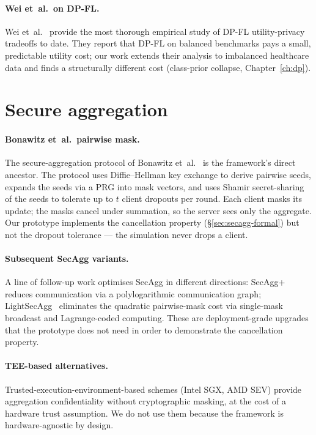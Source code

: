 \documentclass[11pt,a4paper]{report}
\begin{document}
\paragraph{Wei et~al.\ on DP-FL.} Wei et~al.~\cite{wei2020dpfl} provide
the most thorough empirical study of DP-FL utility-privacy tradeoffs to
date. They report that DP-FL on balanced benchmarks pays a small,
predictable utility cost; our work extends their analysis to imbalanced
healthcare data and finds a structurally different cost (class-prior
collapse, Chapter~\ref{ch:dp}).

\section{Secure aggregation}\label{sec:rw-secagg}

\paragraph{Bonawitz et~al.\ pairwise mask.} The secure-aggregation
protocol of Bonawitz et~al.~\cite{bonawitz2017secagg} is the framework's
direct ancestor. The protocol uses Diffie--Hellman key exchange to
derive pairwise seeds, expands the seeds via a PRG into mask vectors,
and uses Shamir secret-sharing of the seeds to tolerate up to $t$ client
dropouts per round. Each client masks its update; the masks cancel under
summation, so the server sees only the aggregate. Our prototype
implements the cancellation property (\S\ref{sec:secagg-formal}) but not
the dropout tolerance --- the simulation never drops a client.

\paragraph{Subsequent SecAgg variants.} A line of follow-up work
optimises SecAgg in different directions: SecAgg+~\cite{bell2020secaggplus}
reduces communication via a polylogarithmic communication graph;
LightSecAgg~\cite{so2022lightsecagg} eliminates the quadratic pairwise-mask
cost via single-mask broadcast and Lagrange-coded computing. These are
deployment-grade upgrades that the prototype does not need in order to
demonstrate the cancellation property.

\paragraph{TEE-based alternatives.} Trusted-execution-environment-based
schemes (Intel SGX, AMD SEV) provide aggregation confidentiality without
cryptographic masking, at the cost of a hardware trust assumption. We do
not use them because the framework is hardware-agnostic by design.
\end{document}
